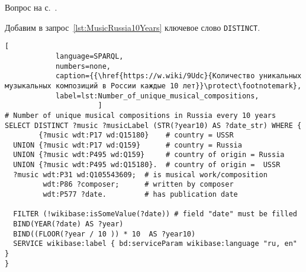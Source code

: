\newpage
\begin{task}
    \AnswerBackref Вопрос на с.~\pageref{question:music_unique}.
    \label{answer:music_unique_answ}

    Добавим в запрос~\ref{lst:MusicRussia10Years} ключевое слово \lstinline|DISTINCT|.
    \begin{lstlisting}[ 
            language=SPARQL, 
            numbers=none, 
            caption={{\href{https://w.wiki/9Udc}{Количество уникальных музыкальных композиций в России каждые 10 лет}}\protect\footnotemark}, 
            label=lst:Number_of_unique_musical_compositions, 
                      ]
# Number of unique musical compositions in Russia every 10 years
SELECT DISTINCT ?music ?musicLabel (STR(?year10) AS ?date_str) WHERE {
        {?music wdt:P17 wd:Q15180}    # country = USSR
  UNION {?music wdt:P17 wd:Q159}      # country = Russia
  UNION {?music wdt:P495 wd:Q159}     # country of origin = Russia
  UNION {?music wdt:P495 wd:Q15180}.  # country of origin =  USSR
  ?music wdt:P31 wd:Q105543609;  # is musical work/composition
         wdt:P86 ?composer;      # written by composer
         wdt:P577 ?date.         # has publication date

  FILTER (!wikibase:isSomeValue(?date)) # field "date" must be filled
  BIND(YEAR(?date) AS ?year)
  BIND((FLOOR(?year / 10 )) * 10  AS ?year10)
  SERVICE wikibase:label { bd:serviceParam wikibase:language "ru, en" }
}
\end{lstlisting}
\end{task}



